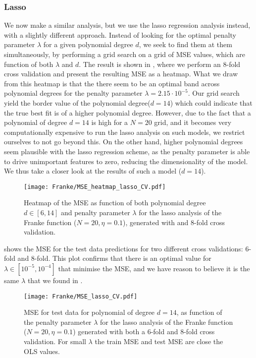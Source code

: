         \subsubsection{Lasso}\label{sec:lassoanalysis}

        We now make a similar analysis, but we use the lasso regression analysis instead, with a slightly different approach. Instead of looking for the optimal penalty parameter $\lambda$ for a given polynomial degree $d$, we seek to find them at them simultaneously, by performing a grid search on a grid of MSE values, which are function of both $\lambda$ and $d$. The result is shown in , where we perform an 8-fold cross validation and present the resulting MSE as a heatmap. 
        What we draw from this heatmap is that the there seem to be an optimal band across polynomial degrees for the penalty parameter $\lambda =2.15\cdot10^{-5}$. Our grid search yield the border value of the polynomial degree($d=14$) which could indicate that the true best fit is of a higher polynomial degree. However, due to the fact that a polynomial of degree $d=14$ is high for a $N=20$ grid, and it becomes very computationally expensive to run the lasso analysis on such models, we restrict ourselves to not go beyond this. On the other hand, higher polynomial degrees seem plausible with the lasso regression scheme, as the penalty parameter is able to drive unimportant features to zero, reducing the dimensionality of the model. We thus take a closer look at the results of such a model ($d=14$). 

        \begin{figure}
            \texttt{[image: Franke/MSE\_heatmap\_lasso\_CV.pdf]}
            \caption{Heatmap of the MSE as function of both polynomial degree $d\in[6,14]$ and penalty parameter $\lambda$ for the lasso analysis of the Franke function ($N=20, \eta=0.1$), generated with and 8-fold cross validation.}
            \label{fig:gridsearch_cv_lasso}
        \end{figure}

         shows the MSE for the test data predictions for two different cross validations: 6-fold and 8-fold. This plot confirms that there is an optimal value for $\lambda\in[10^{-5}, 10^{-4}]$ that minimise the MSE, and we have reason to believe it is the same $\lambda$ that we found in .

        \begin{figure} 
            \texttt{[image: Franke/MSE\_lasso\_CV.pdf]}
            \caption{MSE for test data for polynomial of degree $d=14$, as function of the penalty parameter $\lambda$ for the lasso analysis of the Franke function ($N=20, \eta=0.1$) generated with both a 6-fold and 8-fold cross validation. For small $\lambda$ the train MSE and test MSE are close the OLS values.}
            \label{fig:cross-validation_lasso}
        \end{figure}


